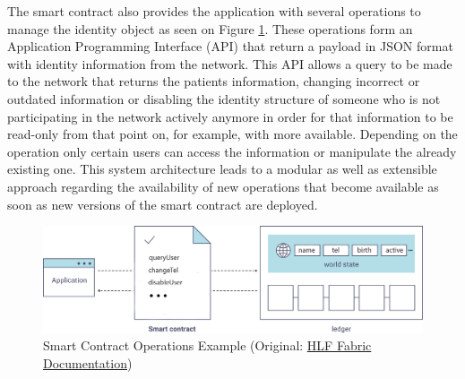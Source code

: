 The smart contract also provides the application with several operations to
manage the identity object as seen on Figure \ref{fig:smartContractOverview}.
These operations form an Application Programming Interface (API) that return a
payload in JSON format with identity information from the network.  This API
allows a query to be made to the network that returns the patients information,
changing incorrect or outdated information or disabling the identity structure
of someone who is not participating in the network actively anymore in order
for that information to be read-only from that point on, for example, with more
available.  Depending on the operation only certain users can access the
information or manipulate the already existing one.  This system architecture
leads to a modular as well as extensible approach regarding the availability of
new operations that become available as soon as new versions of the smart
contract are deployed.  \begin{figure}[ht] \centering
\includegraphics[width=1\linewidth]{imgs/smartContractOverview.png}
\caption{\label{fig:smartContractOverview}Smart Contract Operations Example
(Original:
\href{http://hyperledger-fabric.readthedocs.io/en/latest/write_first_app.html}{HLF
Fabric Documentation})} \end{figure}
